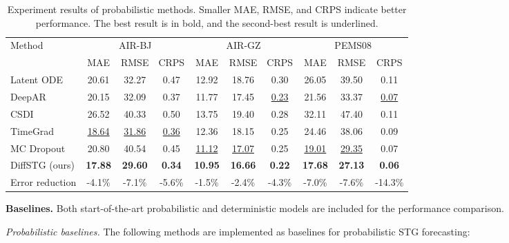 {\begin{table*}[!t]
\centering
\caption{Experiment results of probabilistic methods. Smaller MAE, RMSE, and CRPS indicate better performance. The best result is in bold, and the second-best result is underlined.}
\setlength\tabcolsep{12.2 pt}
\begin{tabular}{l|ccc|ccc|ccc}
\hline %
\multirow{2}{*}{Method}
& \multicolumn{3}{c|}{ AIR-BJ }& \multicolumn{3}{c|}{  AIR-GZ }& \multicolumn{3}{c}{ PEMS08 }\\
\cline{2-10}
 & MAE & RMSE & CRPS & MAE & RMSE & CRPS & MAE & RMSE & CRPS\\
\hline \hline
Latent ODE \cite{rubanova2019latent} & 20.61 & 32.27 & 0.47 & 12.92 & 18.76 & 0.30 & 26.05 & 39.50 & 0.11 \\ \hline
DeepAR \cite{salinas2020deepar} & 20.15 & 32.09 & 0.37 & 11.77 & 17.45 & \underline{0.23} & 21.56 & 33.37 & \underline{0.07} \\ \hline
CSDI \cite{tashiro2021csdi} & 26.52 & 40.33 & 0.50 & 13.75 & 19.40 & 0.28 & 32.11 & 47.40 & 0.11 \\ \hline
TimeGrad \cite{rasul2021autoregressive} & \underline{18.64} & \underline{31.86} & \underline{0.36} & 12.36 & 18.15 & 0.25 & 24.46 & 38.06 & 0.09 \\ \hline
MC Dropout \cite{wu2021quantifying} & 20.80 & 40.54 & 0.45 & \underline{11.12} & \underline{17.07} & 0.25 & \underline{19.01} & \underline{29.35} & 0.07 \\ \hline
DiffSTG (ours) & \textbf{17.88} & \textbf{29.60} & \textbf{0.34} & \textbf{10.95} & \textbf{16.66} & \textbf{0.22} & \textbf{17.68} & \textbf{27.13} & \textbf{0.06} \\ 
Error reduction & -4.1\% & -7.1\% & -5.6\% & -1.5\% & -2.4\% & -4.3\% & -7.0\% & -7.6\% & -14.3\% \\ \hline
\end{tabular}

\label{tab:results}
\end{table*}

\par \noindent \textbf{Baselines.} Both start-of-the-art probabilistic and deterministic models are included for the performance comparison.
\par \textit{Probabilistic baselines.} The following methods are implemented as baselines for probabilistic STG forecasting:

}
